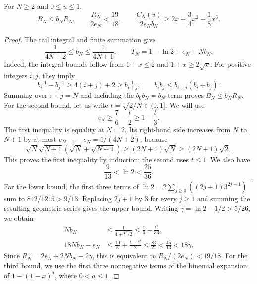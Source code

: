 \begin{lemma}
\label{lem:scalar-moments}
For $N\ge2$ and $0\le u\le1$,
\begin{equation*}
  B_N\le b_NR_N,\qquad
  \frac{R_N}{2e_N}<\frac{19}{18},\qquad
  \frac{C_N(u)}{2e_Nb_N}
  \ge 2x+\frac34x^2+\frac18x^3.
\end{equation*}
\end{lemma}
\begin{proof}
The tail integral and finite summation give
\begin{equation*}
  \frac{1}{4N+2}\le b_N\le\frac{1}{4N+1},\qquad
  T_N=1-\ln 2+e_N+Nb_N.
\end{equation*}
Indeed, the integral bounds follow from
$1+x\le2$ and $1+x\ge2\sqrt{x}$.
For positive integers $i,j$, they imply
\begin{equation*}
  b_i^{-1}+b_j^{-1}\ge4(i+j)+2\ge b_{i+j}^{-1},
  \qquad
  b_i b_j\le b_{i+j}(b_i+b_j).
\end{equation*}
Summing over $i+j=N$ and including the $b_0b_N=b_N$ term proves
$B_N\le b_NR_N$.
For the second bound, let us write $t=\sqrt{2/N}\in(0,1]$.
We will use
\begin{equation}
  \label{eq:scalar-harmonic-bound}
  e_N\ge\frac76-\frac t2\ge1-\frac t3.
\end{equation}
The first inequality is equality at $N=2$.
Its right-hand side increases from $N$ to $N+1$ by at most
$e_{N+1}-e_N=1/(4N+2)$, because
\begin{equation*}
  \sqrt{N}\sqrt{N+1}(\sqrt{N}+\sqrt{N+1})
  \ge(2N+1)\sqrt{N}\ge(2N+1)\sqrt2.
\end{equation*}
This proves the first inequality by induction; the second uses
$t\le1$.
We also have
\begin{equation*}
  \frac9{13}<\ln 2<\frac{25}{36}.
\end{equation*}
For the lower bound, the first three terms of
$\ln 2=2\sum_{j\ge0}((2j+1)3^{2j+1})^{-1}$ sum to
$842/1215>9/13$. Replacing $2j+1$ by $3$
for every $j\ge1$ and summing the resulting geometric series gives the upper bound.
Writing $\gamma=\ln 2-1/2>5/26$, we obtain
\begin{align*}
  Nb_N&\le\frac{1}{4+t^2/2}\le\frac14-\frac{t^2}{36},\\
  18Nb_N-e_N
  &\le\frac{10}{3}+\frac{t-t^2}{2}
  \le\frac{83}{24}<\frac{45}{13}<18\gamma.
\end{align*}
Since $R_N=2e_N+2Nb_N-2\gamma$, this is equivalent to
$R_N/(2e_N)<19/18$.
For the third bound, we use the first three nonnegative terms of
the binomial expansion of $1-(1-x)^a$, where $0<a\le1$.

\end{proof}
